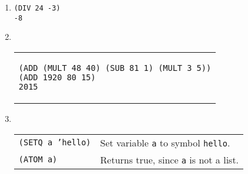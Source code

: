 \documentclass[12pt,letterpaper]{article}
\begin{document}
\begin{enumerate}

\item
\begin{verbatim}
(DIV 24 -3)
-8
\end{verbatim}

\item ~ %
  \\ \begin{tabular}{p{5in}}
\begin{verbatim}
(ADD (MULT 48 40) (SUB 81 1) (MULT 3 5))
(ADD 1920 80 15)
2015
\end{verbatim}
\end{tabular}

\item ~ %
  \\ \begin{tabular}{l l}
\texttt{(SETQ a 'hello)} & Set variable \texttt{a} to symbol \texttt{hello}. \\
\texttt{(ATOM a)}        & Returns true, since \texttt{a} is not a list.
  \end{tabular}
  
\end{enumerate}
\end{document}
